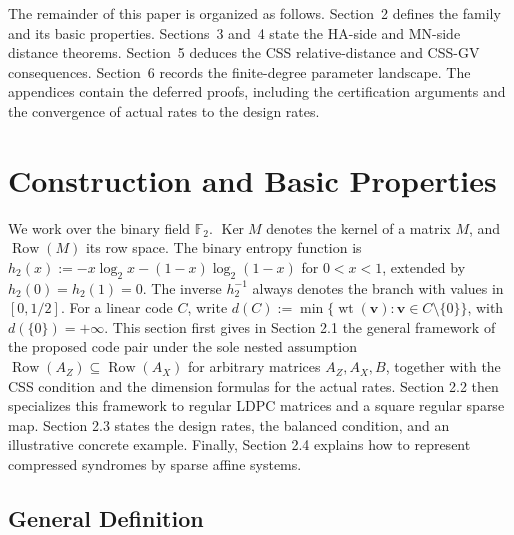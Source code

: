 \documentclass[11pt]{article}
\theoremstyle{definition}
\newcommand{\F}{\mathbb F}
\newcommand{\wt}{\operatorname{wt}}
\newcommand{\Row}{\operatorname{Row}}
\newcommand{\Ker}{\operatorname{Ker}}
\newcommand{\bv}{\mathbf v}
\newcommand{\h}{h_2}
\begin{document}
The remainder of this paper is organized as follows. Section~2 defines the family and its basic properties. Sections~3 and~4 state the HA-side and MN-side distance theorems. Section~5 deduces the CSS relative-distance and CSS-GV consequences. Section~6 records the finite-degree parameter landscape. The appendices contain the deferred proofs, including the certification arguments and the convergence of actual rates to the design rates.

\section{Construction and Basic Properties}

We work over the binary field \(\F_2\).
\(\Ker M\) denotes the kernel of a matrix \(M\), and \(\Row(M)\) its row space.
The binary entropy function is \(\h(x):=-x\log_2 x-(1-x)\log_2(1-x)\)
for \(0<x<1\), extended by \(\h(0)=\h(1)=0\).
The inverse \(\h^{-1}\) always denotes the branch with values in
\([0,1/2]\). For a linear code \(C\), write
\(d(C):=\min\{\wt(\bv):\bv\in C\setminus\{0\}\}\), with
\(d(\{0\})=+\infty\).
This section first gives in Section 2.1 the general framework of the proposed code pair under the sole nested assumption \(\Row(A_Z)\subseteq\Row(A_X)\) for arbitrary matrices \(A_Z,A_X,B\), together with the CSS condition and the dimension formulas for the actual rates. Section 2.2 then specializes this framework to regular LDPC matrices and a square regular sparse map. Section 2.3 states the design rates, the balanced condition, and an illustrative concrete example. Finally, Section 2.4 explains how to represent compressed syndromes by sparse affine systems.

\subsection{General Definition}
\end{document}
